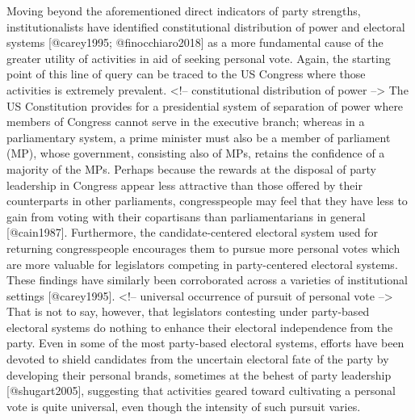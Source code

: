 \documentclass[hyphens, crop=false]{standalone}
\begin{document}
	
		Moving beyond the aforementioned direct indicators of party strengths,
		institutionalists have identified constitutional distribution of power and electoral systems [@carey1995; @finocchiaro2018] as a more fundamental cause of the greater utility of activities in aid of seeking personal vote.
		Again,
		the starting point of this line of query can be traced to the US Congress where those activities is extremely prevalent.
		<!-- constitutional distribution of power --> The US Constitution provides for a presidential system of separation of power where members of Congress cannot serve in the executive branch; whereas in a parliamentary system,
		a prime minister must also be a member of parliament (MP),
		whose government,
		consisting also of MPs,
		retains the confidence of a majority of the MPs.
		Perhaps because the rewards at the disposal of party leadership in Congress appear less attractive than those offered by their counterparts in other parliaments,
		congresspeople may feel that they have less to gain from voting with their copartisans than parliamentarians in general [@cain1987].
		Furthermore,
		the candidate-centered electoral system used for returning congresspeople encourages them to pursue more personal votes which are more valuable for legislators competing in party-centered electoral systems.
		These findings have similarly been corroborated across a varieties of institutional settings [@carey1995].
		<!-- universal occurrence of pursuit of personal vote  --> That is not to say,
		however,
		that legislators contesting under party-based electoral systems do nothing to enhance their electoral independence from the party.
		Even in some of the most party-based electoral systems,
		efforts have been devoted to shield candidates from the uncertain electoral fate of the party by developing their personal brands,
		sometimes at the behest of party leadership [@shugart2005],
		suggesting that activities geared toward cultivating a personal vote is quite universal,
		even though the intensity of such pursuit varies.
		
\end{document}
